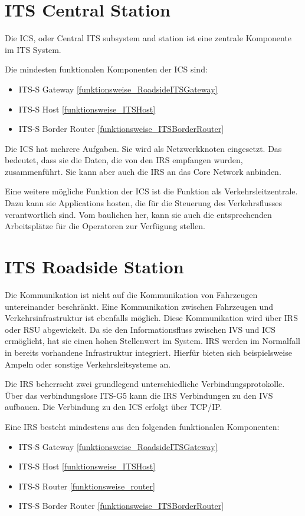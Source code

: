 \section{ITS Central Station}
Die \ac{ICS}, oder Central \ac{ITS} subsystem and station ist eine zentrale Komponente im \ac{ITS} System.

Die mindesten funktionalen Komponenten der \ac{ICS} sind:
\begin{itemize}
	\item \ac{ITS-S} Gateway \ref{funktionsweise_RoadsideITSGateway}
	\item \ac{ITS-S} Host \ref{funktionsweise_ITSHost}
	\item \ac{ITS-S} Border Router \ref{funktionsweise_ITSBorderRouter}
\end{itemize}

Die \ac{ICS} hat mehrere Aufgaben. Sie wird als Netzwerkknoten eingesetzt. Das bedeutet, dass sie die Daten, die von den \ac{IRS} empfangen wurden, zusammenführt. Sie kann aber auch die \ac{IRS} an das Core Network anbinden.

Eine weitere mögliche Funktion der \ac{ICS} ist die Funktion als Verkehrsleitzentrale. Dazu kann sie Applications hosten, die für die Steuerung des Verkehrsflusses verantwortlich sind. Vom baulichen her, kann sie auch die entsprechenden Arbeitsplätze für die Operatoren zur Verfügung stellen. 
	
	
\section{ITS Roadside Station}
Die Kommunikation ist nicht auf die Kommunikation von Fahrzeugen untereinander beschränkt. Eine Kommunikation zwischen Fahrzeugen und Verkehrsinfrastruktur ist ebenfalls möglich. Diese Kommunikation wird über \ac{IRS} oder \ac{RSU} abgewickelt. Da sie den Informationsfluss zwischen \ac{IVS} und \ac{ICS} ermöglicht, hat sie einen hohen Stellenwert im System. \ac{IRS} werden im Normalfall in bereits vorhandene Infrastruktur integriert. Hierfür bieten sich beispielsweise Ampeln oder sonstige Verkehrsleitsysteme an. 

Die \ac{IRS} beherrscht zwei grundlegend unterschiedliche Verbindungsprotokolle. Über das verbindungslose ITS-G5 kann die \ac{IRS} Verbindungen zu den \ac{IVS} aufbauen. Die Verbindung zu den \ac{ICS} erfolgt über TCP/IP. 

Eine \ac{IRS} besteht mindestens aus den folgenden funktionalen Komponenten:

\begin{itemize}
	\item  \ac{ITS-S} Gateway \ref{funktionsweise_RoadsideITSGateway}
	\item \ac{ITS-S} Host \ref{funktionsweise_ITSHost}
	\item \ac{ITS-S} Router \ref{funktionsweise_router}
	\item \ac{ITS-S} Border Router \ref{funktionsweise_ITSBorderRouter}
\end{itemize}

